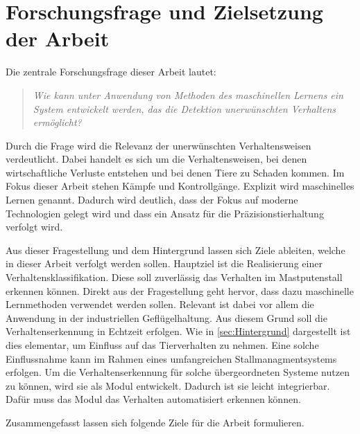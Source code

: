 \section{Forschungsfrage und Zielsetzung der Arbeit} \label{sec:Zielsetzung}

Die zentrale Forschungsfrage dieser Arbeit lautet: 

\begin{quote}
    \textit{Wie kann unter Anwendung von Methoden des maschinellen Lernens ein System entwickelt werden, das die Detektion unerwünschten Verhaltens ermöglicht?}
\end{quote}

Durch die Frage wird die Relevanz der unerwünschten Verhaltensweisen verdeutlicht. Dabei handelt es sich um die Verhaltensweisen, bei denen wirtschaftliche Verluste entstehen und bei denen Tiere zu Schaden kommen. 
Im Fokus dieser Arbeit stehen Kämpfe und Kontrollgänge. Explizit wird maschinelles Lernen genannt. Dadurch wird deutlich, dass der Fokus auf moderne Technologien gelegt wird und dass ein Ansatz für die Präzisionstierhaltung verfolgt wird. \par

Aus dieser Fragestellung und dem Hintergrund lassen sich Ziele ableiten, welche in dieser Arbeit verfolgt werden sollen. Hauptziel ist die Realisierung einer Verhaltensklassifikation. Diese soll zuverlässig das Verhalten im Mastputenstall erkennen können. Direkt aus der Fragestellung geht hervor, dass dazu maschinelle Lernmethoden verwendet werden sollen. Relevant ist dabei vor allem die Anwendung in der industriellen Geflügelhaltung. Aus diesem Grund soll die Verhaltenserkennung in Echtzeit erfolgen. Wie in \autoref{sec:Hintergrund} dargestellt ist dies elementar, um Einfluss auf das Tierverhalten zu nehmen. Eine solche Einflussnahme kann im Rahmen eines umfangreichen Stallmanagmentsystems erfolgen. Um die Verhaltenserkennung für solche übergeordneten Systeme nutzen zu können, wird sie als Modul entwickelt. Dadurch ist sie leicht integrierbar. Dafür muss das Modul das Verhalten automatisiert erkennen können.\par

Zusammengefasst lassen sich folgende Ziele für die Arbeit formulieren.

